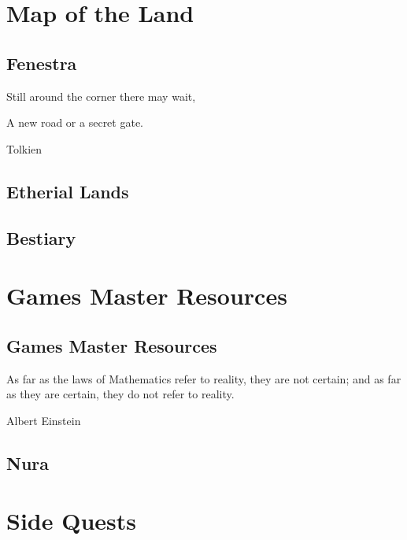 \documentclass[a4paper,openany]{book}
\begin{document}

\tableofcontents

\pagebreak




\part{Map of the Land}

\chapter{Fenestra}
\epigraph{Still around the corner there may wait,

A new road or a secret gate.}{Tolkien}



\chapter{Etherial Lands}



\chapter{Bestiary}



\part{Games Master Resources}

\chapter{Games Master Resources}
\epigraph{As far as the laws of Mathematics refer to reality, they are not certain; and as far as they are certain, they do not refer to reality.}{Albert Einstein}



\chapter{Nura}



\part{Side Quests}
\end{document}
